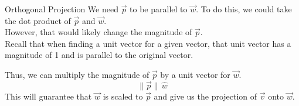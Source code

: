 \documentclass[t,usenames,dvipsnames]{beamer}
\begin{document}
\begin{frame}{Orthogonal Projection}
We need $\vec{p}$ to be parallel to $\vec{w}$. To do this, we could take the dot product of $\vec{p}$ and $\vec{w}$. \newline\\
\pause
However, that would likely change the magnitude of $\vec{p}$. \newline\\
\pause
Recall that when finding a unit vector for a given vector, that unit vector has a magnitude of 1 and is parallel to the original vector.  \newline\\
\pause

Thus, we can multiply the magnitude of $\vec{p}$ by a unit vector for $\vec{w}$.
\[
    \lVert \vec{p} \rVert \, \hat{w}
\]
\pause
This will guarantee that $\vec{w}$ is scaled to $\vec{p}$ and give us the projection of $\vec{v}$ onto $\vec{w}$.
\end{frame}
\end{document}
